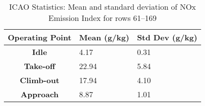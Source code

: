 \begin{table}[H]
  \centering
  \begin{tabularx}{0.6\textwidth}{||c|X|X||}
  \hline
    \cellcolor{gray!20}\textbf{Operating Point} & \cellcolor{gray!20}\textbf{Mean (g/kg)} & \cellcolor{gray!20}\textbf{Std Dev (g/kg)} \\ [0.5ex]
  \hline\hline
    \cellcolor{gray!20}\textbf{Idle} & 4.17 & 0.31 \\
  \hline
    \cellcolor{gray!20}\textbf{Take-off} & 22.94 & 5.84 \\
  \hline
    \cellcolor{gray!20}\textbf{Climb-out} & 17.94 & 4.10 \\
  \hline
    \cellcolor{gray!20}\textbf{Approach} & 8.87 & 1.01 \\
  \hline
  \end{tabularx}
  \caption{ICAO Statistics: Mean and standard deviation of NOx Emission Index for rows 61--169}
  \label{tab:icao_stats}
\end{table}
